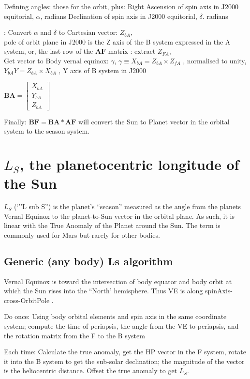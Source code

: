 \documentclass[draft]{article}
\begin{document}
Defining angles: those for the orbit, plus:
\qi Right Ascension of spin axis in J2000 equitorial, $\alpha$,   radians
\qi Declination of spin axis in J2000 equitorial,  $\delta$.  radians

 : Convert  $\alpha$ and  $\delta$  to Cartesian vector: $Z_{bA}$,
\\ pole of orbit plane in J2000 is the Z axis of the B system expressed in the A system, or, the last row of the $ \mathbf{AF} $ matrix
\qi  {}: extract  $Z_{FA}$, 
\\ Get vector to Body vernal equinox: $\gamma$, 
\qi $\gamma \equiv X_{bA} = Z_{bA} \times Z_{fA}$ , normalised to unity, 
\qi $ Y_{bA}Y = Z_{bA} \times X_{bA}$ , Y axis of B system in J2000

$\mathbf{BA} =\left[ \begin{array}{c}  X_{bA} \\ Y_{bA}  \\ Z_{bA} \end{array}  \right] $

Finally: $\mathbf{BF} = \mathbf{BA} \ast \mathbf{AF} $ will convert the Sun to Planet vector in the orbital system to the season system.

\section{$L_S$, the planetocentric longitude of the Sun}
$L_S$ (`''L sub S'') is the planet's ``season'' measured as the angle from the planets Vernal Equinox to the planet-to-Sun vector in the orbital plane. As such, it is linear with the True Anomaly of the Planet around the Sun. The term is commonly used for Mars but rarely for other bodies.

\subsection{Generic (any body) Ls algorithm}

Vernal Equinox is toward the intersection of body equator and body orbit at
which the Sun rises into the ``North' hemisphere. Thus VE is along
spinAxis-cross-OrbitPole .

Do once: Using body orbital elements and spin axis in the same coordinate system; compute the time of periapsis, the angle from the VE to periapsis, and the rotation matrix from the F to the B system

Each time: Calculate the true anomaly, get the HP vector in the F system, rotate it into the B system to get the sub-solar declination; the magnitude of the vector is the heliocentric distance. Offset the true anomaly to get $L_S$.
\end{document}
